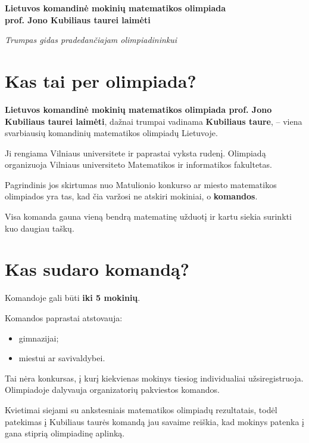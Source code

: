 \documentclass[11pt,a4paper]{article}
\begin{document}
\begin{center}
{\LARGE\bfseries\color{heading}
Lietuvos komandinė mokinių matematikos olimpiada\\
prof. Jono Kubiliaus taurei laimėti
}

\vspace{0.5em}

{\large\itshape Trumpas gidas pradedančiajam olimpiadininkui}
\end{center}

\vspace{0.8em}

\section{Kas tai per olimpiada?}

\textbf{Lietuvos komandinė mokinių matematikos olimpiada prof. Jono Kubiliaus taurei laimėti}, dažnai trumpai vadinama \textbf{Kubiliaus taure}, – viena svarbiausių komandinių matematikos olimpiadų Lietuvoje.

Ji rengiama Vilniaus universitete ir paprastai vyksta rudenį. Olimpiadą organizuoja Vilniaus universiteto Matematikos ir informatikos fakultetas.

Pagrindinis jos skirtumas nuo Matulionio konkurso ar miesto matematikos olimpiados yra tas, kad čia varžosi ne atskiri mokiniai, o \textbf{komandos}.

Visa komanda gauna vieną bendrą matematinę užduotį ir kartu siekia surinkti kuo daugiau taškų.

\section{Kas sudaro komandą?}

Komandoje gali būti \textbf{iki 5 mokinių}.

Komandos paprastai atstovauja:
\begin{itemize}
  \item gimnazijai;
  \item miestui ar savivaldybei.
\end{itemize}

Tai nėra konkursas, į kurį kiekvienas mokinys tiesiog individualiai užsiregistruoja. Olimpiadoje dalyvauja organizatorių pakviestos komandos.

Kvietimai siejami su ankstesniais matematikos olimpiadų rezultatais, todėl patekimas į Kubiliaus taurės komandą jau savaime reiškia, kad mokinys patenka į gana stiprią olimpiadinę aplinką.
\end{document}
